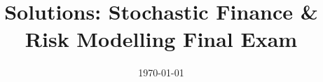 \documentclass{article}
\begin{document}
\title{Solutions: Stochastic Finance \& Risk Modelling Final Exam}
\author{}
\date{\today}

\maketitle

\tableofcontents
\newpage







\end{document}
